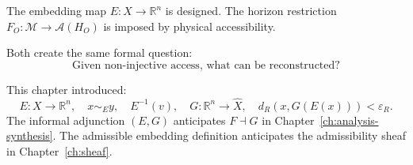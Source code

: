 The embedding map $E : X \to \mathbb{R}^n$ is designed.
The horizon restriction
$F_O : \mathcal{M} \to \mathcal{A}(H_O)$
is imposed by physical accessibility.

Both create the same formal question:
\[
  \text{Given non-injective access, what can be reconstructed?}
\]

\begin{MathEcho}
  This chapter introduced:
  \[
    E : X \to \mathbb{R}^n,
    \quad
    x \sim_E y,
    \quad
    E^{-1}(v),
    \quad
    G : \mathbb{R}^n \to \hat{X},
    \quad
    d_R(x, G(E(x))) < \varepsilon_R.
  \]
  The informal adjunction $(E, G)$ anticipates
  $F \dashv G$ in Chapter~\ref{ch:analysis-synthesis}.
  The admissible embedding definition anticipates the
  admissibility sheaf in Chapter~\ref{ch:sheaf}.
\end{MathEcho}

